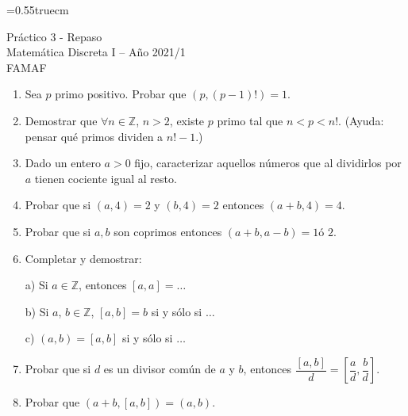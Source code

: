 \documentclass[a4paper,12pt,twoside,spanish,reqno]{amsbook}
\numberwithin{equation}{section}
\begin{document}
    \baselineskip=0.55truecm %

{\bf \begin{center} Práctico 3 - Repaso \\ Matemática Discreta I -- Año 2021/1 \\ FAMAF\end{center}}




\begin{enumerate}
\setlength\itemsep{1.1em}

\item Sea $p$ primo positivo. Probar que $(p,(p-1)!)=1$.



\item Demostrar que $\forall n\in{\mathbb Z}$, $n>2$, existe $p$ primo tal que $n<p<n!$. (Ayuda: pensar qu\'e primos dividen a $n! - 1$.)





\item Dado un entero $a>0$ fijo, caracterizar aquellos n\'umeros que al dividirlos por $a$ tienen cociente igual al resto.




\item Probar que si $(a,4)=2$ y $(b,4)=2$ entonces $(a+b,4)=4$.


\item Probar que si $a,b$ son coprimos entonces $(a+b,a-b)=1 \text{
\'o } 2 $.







\item Completar y demostrar:

a) Si $a \in {\mathbb Z}$, entonces $[a,a]=\dots$

b) Si $a$, $b \in {\mathbb Z}$, $[a,b]=b$ si y s\'olo si $\ldots$

c) $(a,b)=[a,b]$ si y s\'olo si $\ldots$




\item Probar que si $d$ es un divisor com\'un de $a$ y $b$, entonces $\dfrac{[a,b]}{d} = \left[\dfrac{a}{d},\dfrac{b}{d}\right]$.





\item Probar que $(a+b,[a,b])=(a,b)$. %




\end{enumerate}
\end{document}

